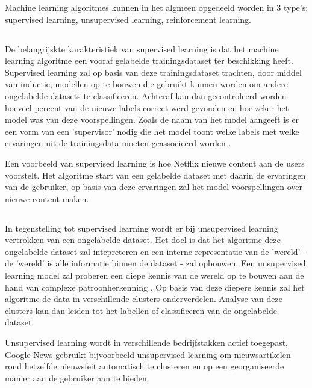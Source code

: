 Machine learning algoritmes kunnen in het algmeen opgedeeld worden in 3 type's: supervised learning, unsupervised learning, reinforcement learning.

\subsection{}
\label{sec:supervised-learning}
De belangrijskte karakteristiek van supervised learning is dat het machine learning algoritme een vooraf gelabelde trainingsdataset ter beschikking heeft. Supervised learning zal op basis van deze trainingsdataset trachten, door middel van inductie, modellen op te bouwen die gebruikt kunnen worden om andere ongelabelde datasets te classificeren. Achteraf kan dan gecontroleerd worden hoeveel percent van de nieuwe labels correct werd gevonden en hoe zeker het model was van deze voorspellingen. Zoals de naam van het model aangeeft is er een vorm van een 'supervisor' nodig die het model toont welke labels met welke ervaringen uit de trainingsdata moeten geassocieerd worden \autocite{Cunningham2008}. 

Een voorbeeld van supervised learning is hoe Netflix nieuwe content aan de users voorstelt. Het algoritme start van een gelabelde dataset met daarin de ervaringen van de gebruiker, op basis van deze ervaringen zal het model voorspellingen over nieuwe content maken.

\subsection{}
\label{sec:unsupervised-learning}
In tegenstelling tot supervised learning wordt er bij unsupervised learning vertrokken van een ongelabelde dataset. Het doel is dat het algoritme deze ongelabelde dataset zal intepreteren en een interne representatie van de 'wereld' - de 'wereld' is alle informatie binnen de dataset - zal opbouwen. Een unsupervised learning model zal proberen een diepe kennis van de wereld op te bouwen aan de hand van complexe patroonherkenning \autocite{Hinton1999}. Op basis van deze diepere kennis zal het algoritme de data in verschillende clusters onderverdelen. Analyse van deze clusters kan dan leiden tot het labellen of classificeren van de ongelabelde dataset.

Unsupervised learning wordt in verschillende bedrijfstakken actief toegepast, Google News gebruikt bijvoorbeeld unsupervised learning om nieuwsartikelen rond hetzelfde nieuwsfeit automatisch te clusteren en op een georganiseerde manier aan de gebruiker aan te bieden.

